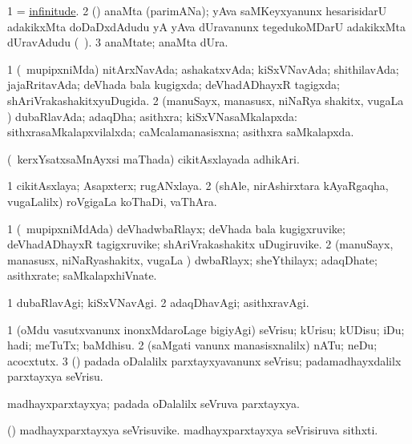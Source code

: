 \bentry
{}
\gl{\nA}
\bmng
\bnum
\num{1}  = \hyperlink{infinitude}{infinitude}. 
\num{2} (\ga) anaMta (parimANa); yAva saMKeyxyanunx hesarisidarU adakikxMta doDaDxdAdudu yA yAva dUravanunx tegedukoMDarU adakikxMta dUravAdudu (\saMkeV\ \eng{$\infty$}). 
\num{3} anaMtate; anaMta dUra. 
\enum
\emng
\eentry

\bentry
{}
\gl{\gu}
\bmng
\bnum
\num{1} (\kanmu\ mupipxniMda) nitArxNavAda; ashakatxvAda; kiSxVNavAda; shithilavAda; jajaRritavAda; deVhada bala kugigxda; deVhadADhayxR tagigxda; shAriVrakashakitxyuDugida. 
\num{2} (manuSayx, manasusx, niNaRya shakitx, \mo vugaLa \vi) dubaRlavAda; adaqDha; asithxra; kiSxVNasaMkalapxda:  sithxrasaMkalapxvilalxda; caMcalamanasisxna; asithxra saMkalapxda. 
\enum
\emng
\eentry

\bentry
{}
\gl{\nA}
\bmng
(\kanmu\ kerxYsatxsaMnAyxsi maThada) cikitAsxlayada adhikAri. 
\emng
\eentry

\bentry
{}
\gl{\nA}
\bmng
\bnum
\num{1} cikitAsxlaya; Asapxterx; rugANxlaya. 
\num{2} (shAle, nirAshirxtara kAyaRgaqha, \mo vugaLalilx) roVgigaLa koThaDi, vaThAra. 
\enum
\emng
\eentry

\bentry
{}
\gl{\nA}
\bmng
\bnum
\num{1} (\kanmu\ mupipxniMdAda) deVhadwbaRlayx; deVhada bala kugigxruvike; deVhadADhayxR tagigxruvike; shAriVrakashakitx uDugiruvike. 
\num{2} (manuSayx, manasusx, niNaRyashakitx, \mo vugaLa \vi) dwbaRlayx; sheYthilayx; adaqDhate; asithxrate; saMkalapxhiVnate. 
\enum
\emng
\eentry

\bentry
{}
\gl{\kirxvi}
\bmng
\bnum
\num{1} dubaRlavAgi; kiSxVNavAgi. 
\num{2} adaqDhavAgi; asithxravAgi. 
\enum
\emng
\eentry

\bentry
{}
\gl{\sakirx}
\bmng
\bnum
\num{1} (oMdu vasutxvanunx inonxMdaroLage bigiyAgi) seVrisu; kUrisu; kUDisu; iDu; hadi; meTuTx; baMdhisu. 
\num{2} (saMgati \mo vanunx manasisxnalilx) nATu; neDu; acocxtutx. 
\num{3} (\vAyx) padada oDalalilx parxtayxyavanunx seVrisu; padamadhayxdalilx parxtayxya seVrisu. 
\enum
\emng
\eentry

\bentry
{}
\gl{\nA}
\bmng
madhayxparxtayxya; padada oDalalilx seVruva parxtayxya. 
\emng
\eentry

\bentry
{}
\gl{\nA}
\bmng
(\vAyx) 
\banum
{} madhayxparxtayxya seVrisuvike. 
 madhayxparxtayxya seVrisiruva sithxti. 
\eanum
\emng
\eentry

